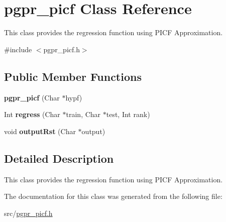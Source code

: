 \hypertarget{classpgpr__picf}{\section{pgpr\-\_\-picf Class Reference}
\label{classpgpr__picf}
}


This class provides the regression function using P\-I\-C\-F Approximation.  




{\ttfamily \#include $<$pgpr\-\_\-picf.\-h$>$}

\subsection*{Public Member Functions}
\begin{DoxyCompactItemize}
\item 
\hypertarget{classpgpr__picf_a2551a94f13420781932ad0208d4bcb7b}{{\bfseries pgpr\-\_\-picf} (Char $\ast$hypf)}\label{classpgpr__picf_a2551a94f13420781932ad0208d4bcb7b}

\item 
\hypertarget{classpgpr__picf_a5b26e798f2d3648d53a0f93bcac3de47}{Int {\bfseries regress} (Char $\ast$train, Char $\ast$test, Int rank)}\label{classpgpr__picf_a5b26e798f2d3648d53a0f93bcac3de47}

\item 
\hypertarget{classpgpr__picf_a038630ff4cead4d90d5ff0fe4b90444b}{void {\bfseries output\-Rst} (Char $\ast$output)}\label{classpgpr__picf_a038630ff4cead4d90d5ff0fe4b90444b}

\end{DoxyCompactItemize}


\subsection{Detailed Description}
This class provides the regression function using P\-I\-C\-F Approximation. 

The documentation for this class was generated from the following file\-:\begin{DoxyCompactItemize}
\item 
src/\hyperlink{pgpr__picf_8h}{pgpr\-\_\-picf.\-h}\end{DoxyCompactItemize}
